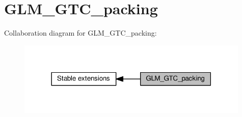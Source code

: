 \hypertarget{group__gtc__packing}{}\section{G\+L\+M\+\_\+\+G\+T\+C\+\_\+packing}
\label{group__gtc__packing}
Collaboration diagram for G\+L\+M\+\_\+\+G\+T\+C\+\_\+packing\+:
\nopagebreak
\begin{figure}[H]
\begin{center}
\leavevmode
\includegraphics[width=314pt]{d5/daf/group__gtc__packing}
\end{center}
\end{figure}
